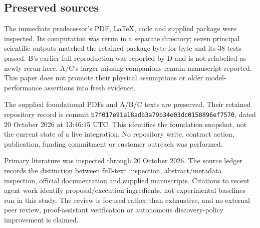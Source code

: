 \documentclass[11pt,letterpaper]{article}
\theoremstyle{definition}\newtheorem{definition}[theorem]{Definition}
\theoremstyle{remark}\newtheorem{remark}[theorem]{Remark}
\begin{document}
\subsection{Preserved sources}
The immediate predecessor's PDF, LaTeX, code and supplied package were inspected. Its computation was rerun in a separate directory; seven principal scientific outputs matched the retained package byte-for-byte and its 38 tests passed. B's earlier full reproduction was reported by D and is not relabelled as newly rerun here. A/C's larger missing companions remain manuscript-reported. This paper does not promote their physical assumptions or older model-performance assertions into fresh evidence.

The supplied foundational PDFs and A/B/C texts are preserved. Their retained repository record is commit \texttt{b7f017e91a18adb3a79b34e03dc0158896ef7570}, dated 20 October 2026 at 13:46:15 UTC. This identifies the foundation snapshot, not the current state of a live integration. No repository write, contract action, publication, funding commitment or customer outreach was performed.

Primary literature was inspected through 20 October 2026. The source ledger records the distinction between full-text inspection, abstract/metadata inspection, official documentation and supplied manuscripts. Citations to recent agent work identify proposal/execution ingredients, not experimental baselines run in this study. The review is focused rather than exhaustive, and no external peer review, proof-assistant verification or autonomous discovery-policy improvement is claimed.
\end{document}
